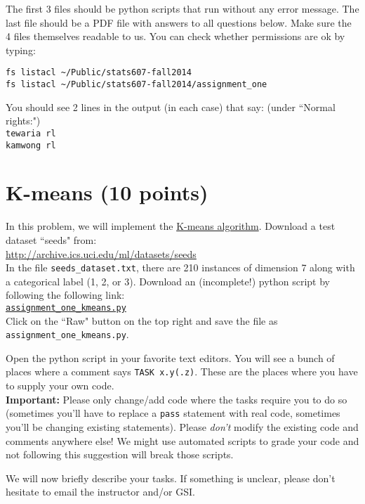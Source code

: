 \documentclass{article}
\begin{document}
The first 3 files should be python scripts that run without any error message. The last file should be a PDF file with answers to all questions below. Make sure the 4 files
themselves readable to us. You can check whether permissions are ok by typing:
\begin{verbatim}
fs listacl ~/Public/stats607-fall2014
fs listacl ~/Public/stats607-fall2014/assignment_one
\end{verbatim}
You should see 2 lines in the output (in each case) that say: (under ``Normal rights:")\\
{\tt tewaria rl}\\
{\tt kamwong rl}

\section{K-means (10 points)}

In this problem, we will implement the \href{http://en.wikipedia.org/wiki/K-means_clustering\#Standard_algorithm}{K-means algorithm}. Download a test dataset ``seeds" from:\\
\url{http://archive.ics.uci.edu/ml/datasets/seeds} \\
In the file {\tt seeds\_dataset.txt}, there are 210 instances of dimension 7 along with a categorical label (1, 2, or 3). Download an (incomplete!) python script by following the following
link:\\
\href{https://github.com/ambujtewari/stats607a-fall2014/blob/master/homeworks/assignment_one_kmeans.py}{\tt assignment\_one\_kmeans.py} \\
Click on the ``Raw" button on the top right and save the file as {\tt assignment\_one\_kmeans.py}.

Open the python script in your favorite text editors. You will see a bunch of places where a comment says {\tt TASK x.y(.z)}. These are the places where you have to supply your
own code.\\
{\bf Important:} Please only change/add code where the tasks require you to do so (sometimes you'll have to replace a {\tt pass} statement with real code, sometimes you'll be changing existing statements). Please {\em don't} modify the existing code and comments anywhere else! We might use automated scripts to grade your code and not following this suggestion will break those scripts.

We will now briefly describe your tasks. If something is unclear, please don't hesitate to email the instructor and/or GSI.
\end{document}
